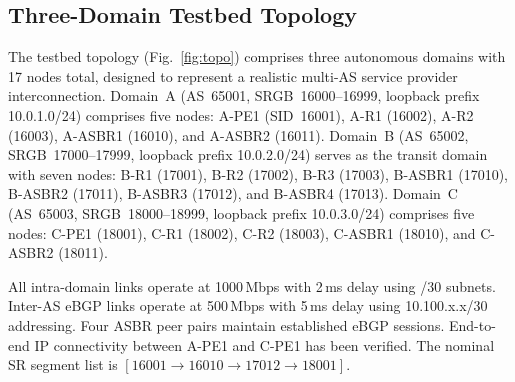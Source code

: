\documentclass[conference]{IEEEtran}
\begin{document}
\subsection{Three-Domain Testbed Topology}

The testbed topology (Fig.~\ref{fig:topo}) comprises three autonomous
domains with 17 nodes total, designed to represent a realistic
multi-AS service provider interconnection. Domain~A (AS~65001,
SRGB~16000--16999, loopback prefix 10.0.1.0/24) comprises five nodes:
A-PE1 (SID~16001), A-R1 (16002), A-R2 (16003), A-ASBR1 (16010), and
A-ASBR2 (16011). Domain~B (AS~65002, SRGB~17000--17999, loopback
prefix 10.0.2.0/24) serves as the transit domain with seven nodes:
B-R1 (17001), B-R2 (17002), B-R3 (17003), B-ASBR1 (17010), B-ASBR2
(17011), B-ASBR3 (17012), and B-ASBR4 (17013). Domain~C (AS~65003,
SRGB~18000--18999, loopback prefix 10.0.3.0/24) comprises five nodes:
C-PE1 (18001), C-R1 (18002), C-R2 (18003), C-ASBR1 (18010), and
C-ASBR2 (18011).

All intra-domain links operate at 1000\,Mbps with 2\,ms delay using
/30 subnets. Inter-AS eBGP links operate at 500\,Mbps with 5\,ms
delay using 10.100.x.x/30 addressing. Four ASBR peer pairs maintain
established eBGP sessions. End-to-end IP connectivity between A-PE1
and C-PE1 has been verified. The nominal SR segment list is
$[16001 \to 16010 \to 17012 \to 18001]$.
\end{document}
